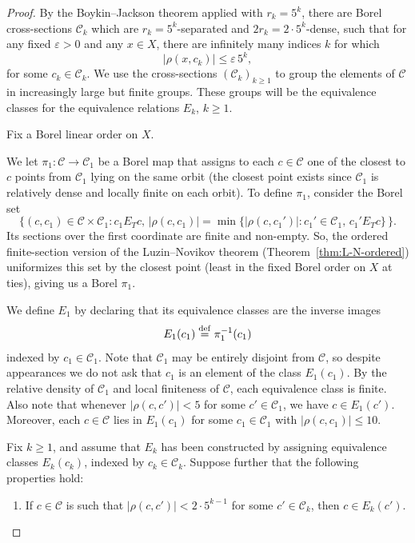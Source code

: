 \documentclass[11pt]{paper}
\newcommand{\cC}{\mathcal C}
\newcommand{\eps}{\varepsilon}
\begin{document}
\begin{proof}
By the Boykin--Jackson theorem applied with $r_k=5^k$, there are
Borel cross-sections $\cC_k$ which are $r_k=5^k$-separated
and $2r_k = 2\cdot 5^k$-dense, such that for any fixed $\eps>0$ and any
$x\in X$, there are infinitely many indices $k$ for which
\begin{equation}
\label{eq:recurrence2}
| \rho(x, c_k)| \le \eps \, 5^k,
\end{equation}
for some $c_k\in\cC_k$.  We use the cross-sections $(\cC_k)_{k\ge 1}$ to group the elements
of $\cC$ in increasingly large but finite groups. These groups will
be the equivalence classes for the equivalence relations $E_k$, $k\ge 1$.

Fix a Borel linear order on $X$.

\smallskip We let $\pi_1\colon \cC\to \cC_1$ be a Borel map that assigns
to each $c\in\cC$ one of the closest to $c$ points from $\cC_1$ lying on the same orbit
(the closest point exists since $\cC_1$ is relatively dense and locally finite on each orbit).
To define $\pi_1$, consider the Borel set
\[
\{(c, c_1)\in \cC\times \cC_1 \colon c_1E_Tc, \, |\rho(c, c_1)|
= \min \{|\rho(c, c_1')|\colon c_1'\in\cC_1, \, c_1' E_T c\}\,
\}.
\]
Its sections over the first coordinate are finite and non-empty. So, the ordered
finite-section version of the Luzin--Novikov theorem (Theorem~\ref{thm:L-N-ordered})
uniformizes this set by the closest point (least in the fixed Borel order on $X$ at ties),
giving us a Borel $\pi_1$.

We define $E_1$ by declaring that its equivalence classes are the inverse images
\[
E_1(c_1)\overset{\rm def}{=}\pi^{-1}_1(c_1)
\]
indexed by $c_1\in\cC_1$. Note that $\cC_1$ may be entirely
disjoint from $\cC$, so despite appearances we do not ask that
$c_1$ is an element of the class $E_1(c_1)$.
By the relative density of $\cC_1$ and local finiteness of $\cC$, each equivalence class is finite.
Also note that whenever $|\rho(c, c')|<5$ for some $c'\in \cC_1$, we have
$c\in E_1(c')$. Moreover, each $c\in\cC$ lies in
$E_1(c_1)$ for some $c_1\in\cC_1$ with $|\rho(c, c_1)|\le 10$.

\smallskip
Fix $k\ge 1$, and assume that $E_{k}$ has been constructed
by assigning equivalence classes $E_{k}(c_k)$, indexed by $c_k\in\cC_{k}$.
Suppose further that the following properties hold:
\begin{enumerate}
\item[(i)] If $c \in\cC$ is such that $|\rho(c, c')|<2 \cdot 5^{k-1}$ for
some $c'\in\cC_{k}$, then $c \in E_{k}(c')$.


\end{enumerate}
\end{proof}
\end{document}

